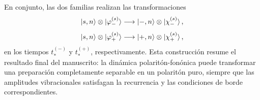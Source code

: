 En conjunto, las dos familias realizan las transformaciones
\begin{equation}
  \ket{s,n}\otimes\ket{\varphi_-^{(s)}}
  \longrightarrow
  \ket{-,n}\otimes\ket{\chi_-^{(s)}},
\end{equation}
\begin{equation}
  \ket{s,n}\otimes\ket{\varphi_+^{(s)}}
  \longrightarrow
  \ket{+,n}\otimes\ket{\chi_+^{(s)}},
\end{equation}
en los tiempos $t_*^{(-)}$ y $t_*^{(+)}$, respectivamente. Esta construcci\'on
resume el resultado final del manuscrito: la din\'amica polarit\'on-fon\'onica
puede transformar una preparaci\'on completamente separable en un polarit\'on
puro, siempre que las amplitudes vibracionales satisfagan la recurrencia y las
condiciones de borde correspondientes.
